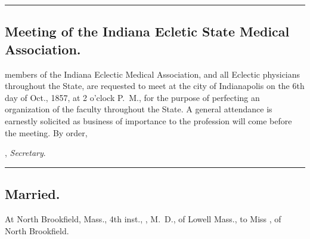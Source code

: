 \fancybreak{* * *}
\subsection*{Meeting of the Indiana Ecletic State Medical Association.}

 members of the Indiana Eclectic Medical Association, and all
Eclectic physicians throughout the State, are requested to meet at the
city of Indianapolis on the 6th day of Oct., 1857, at 2 o'clock P.~M.,
for the purpose of perfecting an organization of the faculty throughout
the State. A general attendance is earnestly solicited as business of importance
to the profession will come before the meeting. By order,

\hfill{}, \emph{Secretary}.

\fancybreak{* * *}
\subsection*{Married.}

\footnotesize
At North Brookfield, Mass., 4th inst., , M.~D., of Lowell Mass., to Miss
, of North Brookfield.
\normalsize
\clearpage